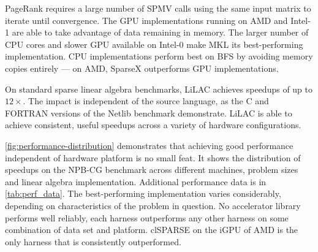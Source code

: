 PageRank requires a large number of SPMV calls using the same input matrix to
iterate until convergence.
The GPU implementations running on AMD and Intel-1 are able to take advantage of
data remaining in memory.
The larger number of CPU cores and slower GPU available on \mbox{Intel-0} make
MKL its best-performing implementation.
CPU implementations perform best on BFS by avoiding memory copies entirely
--- on AMD, SparseX outperforms GPU implementations.

On standard sparse linear algebra benchmarks, LiLAC achieves speedups of up to
$12\times$.
The impact is independent of the source language, as the C and FORTRAN versions
of the Netlib benchmark demonstrate.
LiLAC is able to achieve consistent, useful speedups across a variety of
hardware configurations.


\autoref{fig:performance-distribution} demonstrates that achieving good
performance independent of hardware platform is no small feat.
It shows the distribution of speedups on the NPB-CG benchmark across different
machines, problem sizes and linear algebra implementation.
Additional performance data is in \autoref{tab:perf_data}.
The best-performing implementation varies considerably, depending on
characteristics of the problem in question.
No accelerator library performs well reliably, each harness outperforms
any other harness on some combination of data set and platform.
clSPARSE on the iGPU of AMD is the only harness that is consistently
outperformed.

